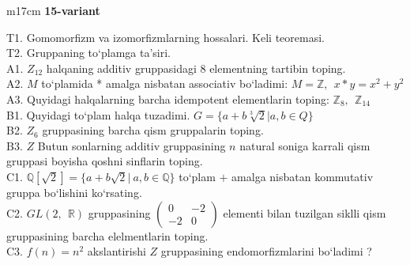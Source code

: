 \documentclass{article}
\begin{document}
\begin{tabular}{m{17cm}}
\textbf{15-variant}
\newline

T1. Gomomorfizm va izomorfizmlarning hossalari. Keli teoremasi. \\
T2. Gruppaning to`plamga ta'siri. \\
A1. \(Z_{12}\) halqaning additiv gruppasidagi 8 elementning tartibin toping. \\
A2. \(M\) to`plamida * amalga nisbatan associativ bo`ladimi: \(M\mathbb{= Z},\ \ x*y = x^{2} + y^{2}\) \\
A3. Quyidagi halqalarning barcha idempotent elementlarin toping: \(\mathbb{Z}_{8},\ \ \mathbb{Z}_{14}\) \\
B1. Quyidagi to`plam halqa tuzadimi. \(G = \{ a + b\sqrt[3]{2}|a,b \in Q\}\) \\
B2. \(Z_{6}\) gruppasining barcha qism gruppalarin toping. \\
B3. \(Z\) Butun sonlarning additiv gruppasining \(n\) natural soniga karrali qism gruppasi boyisha qo\textquotesingle shni sinflarin toping. \\
C1. \(\mathbb{Q}\left\lbrack \sqrt{2} \right\rbrack = \{ a + b\sqrt{2}|\ a,b\mathbb{\in Q}\}\) to`plam \(+\) amalga nisbatan kommutativ gruppa bo`lishini ko`rsating. \\
C2. \(GL(2,\mathbb{\ \ R})\) gruppasining \(\begin{pmatrix}
0 & - 2 \\
 - 2 & 0
\end{pmatrix}\) elementi bilan tuzilgan siklli qism gruppasining barcha elelmentlarin toping. \\
C3. \(f(n) = n^{2}\) akslantirishi \(Z\) gruppasining endomorfizmlarini bo`ladimi ? \\

\end{tabular}
\vspace{1cm}
\end{document}
